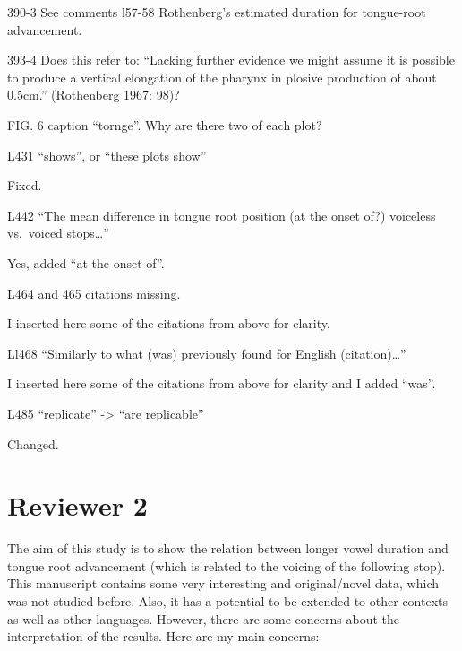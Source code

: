 \documentclass[]{article}
\begin{document}
390-3 See comments l57-58 Rothenberg's estimated duration for
tongue-root advancement.

393-4 Does this refer to: ``Lacking further evidence we might assume it
is possible to produce a vertical elongation of the pharynx in plosive
production of about 0.5cm.'' (Rothenberg 1967: 98)?

FIG. 6 caption ``tornge''. Why are there two of each plot?

L431 ``shows'', or ``these plots show''

\color{plum}

Fixed. \color{black}

L442 ``The mean difference in tongue root position (at the onset of?)
voiceless vs.~voiced stops\ldots{}''

\color{plum}

Yes, added ``at the onset of''. \color{black}

L464 and 465 citations missing.

\color{plum}

I inserted here some of the citations from above for clarity.
\color{black}

Ll468 ``Similarly to what (was) previously found for English
(citation)\ldots{}''

\color{plum}

I inserted here some of the citations from above for clarity and I added
``was''. \color{black}

L485 ``replicate'' -\textgreater{} ``are replicable''

\color{plum}

Changed. \color{black}

\hypertarget{reviewer-2}{%
\section{Reviewer 2}\label{reviewer-2}}

The aim of this study is to show the relation between longer vowel
duration and tongue root advancement (which is related to the voicing of
the following stop). This manuscript contains some very interesting and
original/novel data, which was not studied before. Also, it has a
potential to be extended to other contexts as well as other languages.
However, there are some concerns about the interpretation of the
results. Here are my main concerns:
\end{document}
